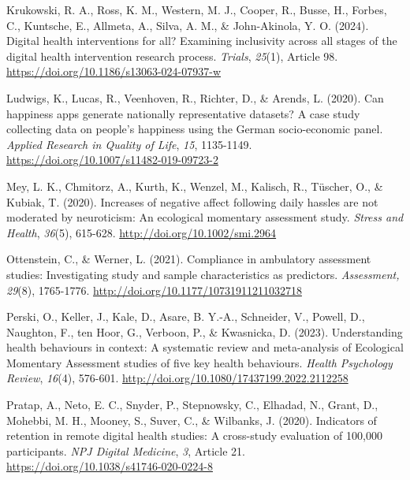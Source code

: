 \documentclass[authordate, empirical]{jote-new-article}
\begin{document}
	Krukowski, R. A., Ross, K. M., Western, M. J., Cooper, R., Busse, H., Forbes, C., Kuntsche, E., Allmeta, A., Silva, A. M., \& John-Akinola, Y. O. (2024). Digital health interventions for all? Examining inclusivity across all stages of the digital health intervention research process. \emph{Trials},\emph{ 25}(1), Article 98. \href{https://doi.org/10.1186/s13063-024-07937-w}{https://doi.org/10.1186/s13063-024-07937-w}



	Ludwigs, K., Lucas, R., Veenhoven, R., Richter, D., \& Arends, L. (2020). Can happiness apps generate nationally representative datasets? A case study collecting data on people's happiness using the German socio-economic panel. \emph{Applied Research in Quality of Life},\emph{ 15}, 1135-1149. \href{https://doi.org/10.1007/s11482-019-09723-2}{https://doi.org/10.1007/s11482-019-09723-2}



	Mey, L. K., Chmitorz, A., Kurth, K., Wenzel, M., Kalisch, R., Tüscher, O., \& Kubiak, T. (2020). Increases of negative affect following daily hassles are not moderated by neuroticism: An ecological momentary assessment study. \emph{Stress and Health},\emph{ 36}(5), 615-628. \href{http://doi.org/10.1002/smi.2964}{http://doi.org/10.1002/smi.2964}



	Ottenstein, C., \& Werner, L. (2021). Compliance in ambulatory assessment studies: Investigating study and sample characteristics as predictors. \emph{Assessment, 29}(8), 1765-1776. \href{http://doi.org/10.1177/10731911211032718}{http://doi.org/10.1177/10731911211032718}



	Perski, O., Keller, J., Kale, D., Asare, B. Y.-A., Schneider, V., Powell, D., Naughton, F., ten Hoor, G., Verboon, P., \& Kwasnicka, D. (2023). Understanding health behaviours in context: A systematic review and meta-analysis of Ecological Momentary Assessment studies of five key health behaviours. \emph{Health Psychology Review},\emph{ 16}(4), 576-601. \href{http://doi.org/10.1080/17437199.2022.2112258}{http://doi.org/10.1080/17437199.2022.2112258}



	Pratap, A., Neto, E. C., Snyder, P., Stepnowsky, C., Elhadad, N., Grant, D., Mohebbi, M. H., Mooney, S., Suver, C., \& Wilbanks, J. (2020). Indicators of retention in remote digital health studies: A cross-study evaluation of 100,000 participants. \emph{NPJ Digital Medicine},\emph{ 3}, Article 21. \href{https://doi.org/10.1038/s41746-020-0224-8}{https://doi.org/10.1038/s41746-020-0224-8}
\end{document}

